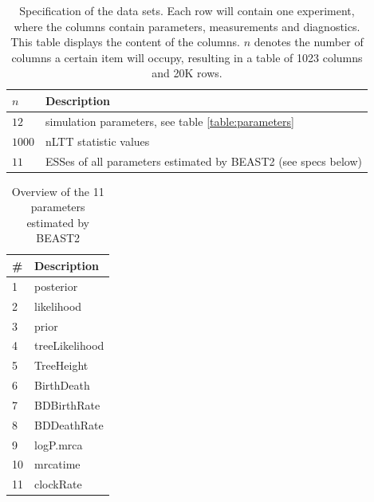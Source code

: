 \documentclass{article}
\begin{document}
\begin{table}
  \centering 
  \begin{tabular}{l l}
    \hline
    $n$ & Description \\
    \hline
    \hline
    $12$   & simulation parameters, see table \ref{table:parameters} \\
    $1000$ & nLTT statistic values \\
    $11$ & ESSes of all parameters estimated by BEAST2 (see specs below) \\
    \hline
  \end{tabular}
  \caption{
    Specification of the data sets. Each row will contain one experiment,
    where the columns contain parameters, measurements and diagnostics.
    This table displays the content of the columns. 
    $n$ denotes the number
    of columns a certain item will occupy, resulting in a table of 
    1023 columns and 20K rows.
  }
  \label{table:specs}
\end{table}

\begin{table}
  \centering 
  \begin{tabular}{l l}
    \hline
    \# & Description \\
    \hline
    \hline
    1 & posterior \\
    2 & likelihood \\
    3 & prior \\
    4 & treeLikelihood \\
    5 & TreeHeight \\
    6 & BirthDeath \\
    7 & BDBirthRate \\
    8 & BDDeathRate \\
    9 & logP.mrca \\
    10 & mrcatime \\
    11 & clockRate \\
    \hline
  \end{tabular}
  \caption{
    Overview of the 11 parameters estimated by BEAST2
  }
  \label{table:estimated_parameters}
\end{table}
\end{document}

